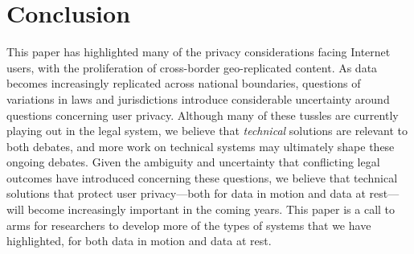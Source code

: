 \section{Conclusion}
\label{sec:conclusion}

This paper has highlighted many of the privacy considerations facing Internet users,
with the proliferation of cross-border geo-replicated content.  As data becomes
increasingly replicated across national boundaries, questions of variations in laws
and jurisdictions introduce considerable uncertainty around questions concerning
user privacy. Although many of these tussles are currently playing out in the legal
system, we believe that {\em technical} solutions are relevant to both debates,
and more work on technical systems may ultimately shape these ongoing debates. Given
the ambiguity and uncertainty that conflicting legal outcomes have introduced concerning
these questions, we believe that technical solutions that protect user privacy---both
for data in motion and data at rest---will become increasingly important in the
coming years. This paper is a call to arms for researchers to develop more of the
types of systems that we have highlighted, for both data in motion and data at rest.